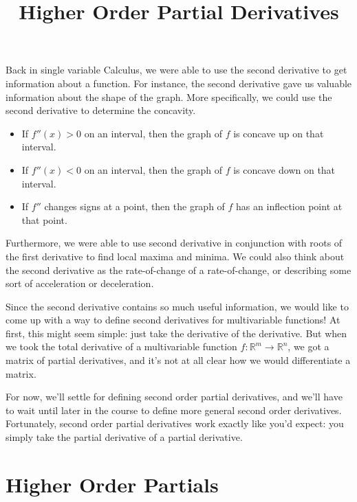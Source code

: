\documentclass{ximera}
\title{Higher Order Partial Derivatives}
\begin{document}
\begin{abstract}
\end{abstract}
\maketitle


Back in single variable Calculus, we were able to use the second derivative to get information about a function. For instance, the second derivative gave us valuable information about the shape of the graph. More specifically, we could use the second derivative to determine the concavity.
\begin{itemize}
\item If $f''(x)>0$ on an interval, then the graph of $f$ is concave up on that interval.
\item If $f''(x)<0$ on an interval, then the graph of $f$ is concave down on that interval.
\item If $f''$ changes signs at a point, then the graph of $f$ has an inflection point at that point.
\end{itemize}
Furthermore, we were able to use second derivative in conjunction with roots of the first derivative to find local maxima and minima. We could also think about the second derivative as the rate-of-change of a rate-of-change, or describing some sort of acceleration or deceleration.

Since the second derivative contains so much useful information, we would like to come up with a way to define second derivatives for multivariable functions! At first, this might seem simple: just take the derivative of the derivative. But when we took the total derivative of a multivariable function $f:\mathbb{R}^m\rightarrow\mathbb{R}^n$, we got a matrix of partial derivatives, and it's not at all clear how we would differentiate a matrix.

For now, we'll settle for defining second order partial derivatives, and we'll have to wait until later in the course to define more general second order derivatives. Fortunately, second order partial derivatives work exactly like you'd expect: you simply take the partial derivative of a partial derivative.

\section*{Higher Order Partials}
\end{document}
